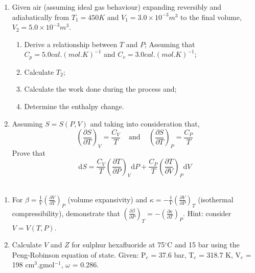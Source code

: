 \documentclass[calculator,fluidstables,datasheet,sample]{exam}
\newcommand{\frc}{\displaystyle\frac}
\renewcommand{\d}[1]{\mathrm{d} #1 }
\begin{document}
\begin{question}
\begin{enumerate}
\item\label{Tut01:FirstLawIdealGas2} Given air (assuming ideal gas behaviour) expanding reversibly and adiabatically from $T_{1}=450 K$ and $V_{1}=3.0\times 10^{-3}m^{3}$ to the final volume, $V_{2}=5.0\times 10^{-3}m^{3}$. %
\begin{enumerate}
\item Derive a relationship between $T$ and $P$; Assuming that $C_{p}= 5.0 cal.\left(mol.K\right)^{-1}$ and $C_{v}=3.0 cal.\left(mol.K\right)^{-1}$;~
\item Calculate $T_{2}$;~
\item Calculate the work done during the process and;~
\item Determine the enthalpy change.~
\end{enumerate}

\item\label{Tut02:Demonstration}Assuming $S = S\left(P,V\right)$ and taking into consideration that,
\begin{displaymath}
\left(\frc{\partial S}{\partial T}\right)_{V} = \frc{C_{V}}{T}\;\;\;\text{ and }\;\;\; \left(\frc{\partial S}{\partial T}\right)_{P} = \frc{C_{P}}{T}
\end{displaymath}
Prove that 
\begin{displaymath}
\d S = \frc{C_{V}}{T}\left(\frc{\partial T}{\partial P}\right)_{V}\d P + \frc{C_{P}}{T}\left(\frc{\partial T}{\partial V}\right)_{P}\d V
\end{displaymath}~

\end{enumerate}
\end{question}
\clearpage

\begin{question}
\begin{enumerate}
\item\label{prove} For $\beta = \frc{1}{V}\left(\frc{\partial V}{\partial T}\right)_{P}$ (volume expansivity) and $\kappa = -\frc{1}{V}\left(\frc{\partial V}{\partial P}\right)_{T}$ (isothermal compressibility), demonstrate that $\left(\frc{\partial\beta}{\partial P}\right)_{T} = -\left(\frc{\partial\kappa}{\partial T}\right)_{P}$. Hint: consider $V=V\left(T,P\right)$.~
\item\label{Tut03:EOS1} Calculate $V$ and $Z$ for sulphur hexafluoride at 75$^{\circ}$C and 15 bar using the Peng-Robinson equation of state. Given: P$_{c}$ = 37.6 bar, T$_{c}$ = 318.7 K, V$_{c}$ = 198 cm$^{3}$.gmol$^{-1}$, $\omega$ = 0.286.~
\end{enumerate}
\end{question}
\end{document}

